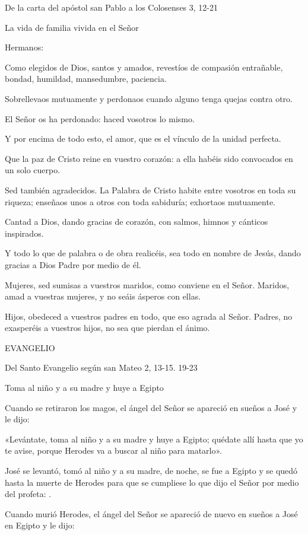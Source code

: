 De la carta del apóstol san Pablo a los Colosenses 3, 12-21

La vida de familia vivida en el Señor

Hermanos:

Como elegidos de Dios, santos y amados, revestíos de compasión
entrañable, bondad, humildad, mansedumbre, paciencia.

Sobrellevaos mutuamente y perdonaos cuando alguno tenga quejas contra
otro.

El Señor os ha perdonado: haced vosotros lo mismo.

Y por encima de todo esto, el amor, que es el vínculo de la unidad
perfecta.

Que la paz de Cristo reine en vuestro corazón: a ella habéis sido
convocados en un solo cuerpo.

Sed también agradecidos. La Palabra de Cristo habite entre vosotros en
toda su riqueza; enseñaos unos a otros con toda sabiduría; exhortaos
mutuamente.

Cantad a Dios, dando gracias de corazón, con salmos, himnos y cánticos
inspirados.

Y todo lo que de palabra o de obra realicéis, sea todo en nombre de
Jesús, dando gracias a Dios Padre por medio de él.

Mujeres, sed sumisas a vuestros maridos, como conviene en el Señor.
Maridos, amad a vuestras mujeres, y no seáis ásperos con ellas.

Hijos, obedeced a vuestros padres en todo, que eso agrada al Señor.
Padres, no exasperéis a vuestros hijos, no sea que pierdan el ánimo.

EVANGELIO

Del Santo Evangelio según san Mateo 2, 13-15. 19-23

Toma al niño y a su madre y huye a Egipto

Cuando se retiraron los magos, el ángel del Señor se apareció en sueños
a José y le dijo:

«Levántate, toma al niño y a su madre y huye a Egipto; quédate allí
hasta que yo te avise, porque Herodes va a buscar al niño para matarlo».

José se levantó, tomó al niño y a su madre, de noche, se fue a Egipto y
se quedó hasta la muerte de Herodes para que se cumpliese lo que dijo el
Señor por medio del profeta: .

Cuando murió Herodes, el ángel del Señor se apareció de nuevo en sueños
a José en Egipto y le dijo:

